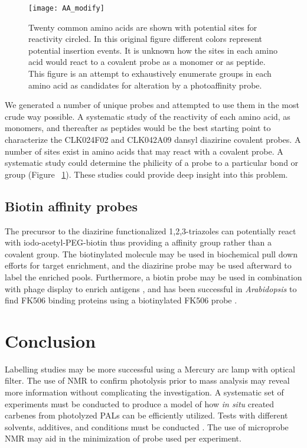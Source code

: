 \begin{figure}\centering
\texttt{[image: AA\_modify]}
\caption{Twenty common amino acids are shown with potential sites for reactivity circled. In this original figure different colors represent potential insertion events. It is unknown how the sites in each amino acid would react to a covalent probe as a monomer or as peptide. This figure is an attempt to exhaustively enumerate groups in each amino acid as candidates for alteration by a photoaffinity probe.}
\label{fig:AA_modify}
\end{figure}

We generated a number of unique probes and attempted to use them in the most crude way possible. A systematic study of the reactivity of each amino acid, as monomers, and thereafter as peptides would be the best starting point to characterize the CLK024F02 and CLK042A09 dansyl diazirine covalent probes. A number of sites exist in amino acids that may react with a covalent probe. A systematic study could determine the philicity of a probe to a particular bond or group (Figure ~\ref{fig:AA_modify}). These studies could provide deep insight into this problem.

\subsection{Biotin affinity probes}

The precursor to the diazirine functionalized 1,2,3-triazoles can potentially react with iodo-acetyl-PEG-biotin thus providing a affinity group rather than a covalent group. The biotinylated molecule may be used in biochemical pull down efforts for target enrichment, and the diazirine probe may be used afterward to label the enriched pools. Furthermore, a biotin probe may be used in combination with phage display to enrich antigens \cite{smith1985filamentous}, and has been successful in {\it Arabidopsis} to find FK506 binding proteins using a biotinylated FK506 probe \cite{piggott2009rapid}.


\section{Conclusion}

Labelling studies may be more successful using a Mercury arc lamp with optical filter. The use of NMR to confirm photolysis prior to mass analysis may reveal more information without complicating the investigation. A systematic set of experiments must be conducted to produce a model of how {\it in situ} created carbenes from photolyzed PALs can be efficiently utilized. Tests with different solvents, additives, and conditions must be conducted \cite{brunner19803}. The use of microprobe NMR may aid in the minimization of probe used per experiment.

